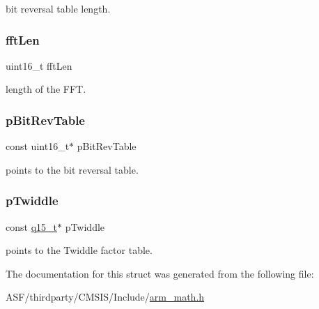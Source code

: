 bit reversal table length. \mbox{\label{structarm__cfft__instance__q15_ab8db3bbe7c61e6bb8ca2a55e3446e11a}} 
\subsubsection{\texorpdfstring{fftLen}{fftLen}}
{\footnotesize\ttfamily uint16\+\_\+t fft\+Len}

length of the F\+FT. \mbox{\label{structarm__cfft__instance__q15_a3b229432d381b0a511a9cdbe3aa74e78}} 
\subsubsection{\texorpdfstring{pBitRevTable}{pBitRevTable}}
{\footnotesize\ttfamily const uint16\+\_\+t$\ast$ p\+Bit\+Rev\+Table}

points to the bit reversal table. \mbox{\label{structarm__cfft__instance__q15_a7f19217cfa0370f9e518caa882265386}} 
\subsubsection{\texorpdfstring{pTwiddle}{pTwiddle}}
{\footnotesize\ttfamily const \mbox{\hyperlink{arm__math_8h_ab5a8fb21a5b3b983d5f54f31614052ea}{q15\+\_\+t}}$\ast$ p\+Twiddle}

points to the Twiddle factor table. 

The documentation for this struct was generated from the following file\+:\begin{DoxyCompactItemize}
\item 
A\+S\+F/thirdparty/\+C\+M\+S\+I\+S/\+Include/\mbox{\hyperlink{arm__math_8h}{arm\+\_\+math.\+h}}\end{DoxyCompactItemize}
